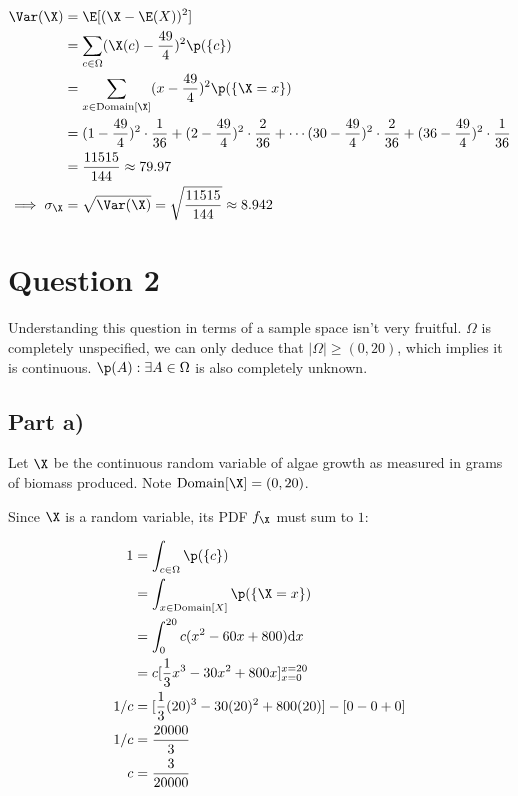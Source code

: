 \begin{align*}
\Var (\X) &= \E [(\X - \E (X))^2] \\
&= \sum _{c \in \Omega} (\X(c) - \frac{49}{4})^2 \p (\{ c \}) \\
&= \sum _{x \in \mathrm{Domain}[\X]} (x - \frac{49}{4})^2 \p (\{ \X = x \}) \\
&= (1 - \frac{49}{4})^2 \cdot \frac{1}{36} + (2 - \frac{49}{4})^2 \cdot \frac{2}{36} + \cdots
	(30 - \frac{49}{4})^2 \cdot \frac{2}{36} + (36 - \frac{49}{4})^2 \cdot \frac{1}{36} \\
&= \frac{11515}{144} \approx 79.97 \\
\implies \sigma _{\X} &= \sqrt{\Var(\X)} = \sqrt{\frac{11515}{144}} \approx 8.942
\end{align*}

\newpage

\section{Question 2}

Understanding this question in terms of a sample space isn't very fruitful.
$\Omega$ is completely unspecified, we can only deduce that $|\Omega| \geq (0, 20)$, which implies it is continuous.
$\p (A) : \exists A \in \Omega$ is also completely unknown.

\subsection{Part a)}

Let $\X$ be the continuous random variable of algae growth as measured in grams of biomass produced.
Note $\mathrm{Domain}[\X] = (0, 20)$.

Since $\X$ is a random variable, its PDF $f_{\X}$ must sum to $1$:

\begin{align*}
1 &= \int _{c \in \Omega} \p (\{ c \}) \\
&= \int _{x \in \mathrm{Domain}[X]} \p(\{ \X = x \}) \\
&= \int _0 ^{20} c(x^2 - 60x + 800) \mathrm{d}x \\
&= c[\frac{1}{3}x^3 - 30x^2 + 800x]_{x = 0}^{x=20} \\
1/c &= [\frac{1}{3}(20)^3 - 30(20)^2 + 800(20)] - [0 - 0 + 0] \\
1/c &= \frac{20000}{3} \\
c &= \frac{3}{20000}
\end{align*}

